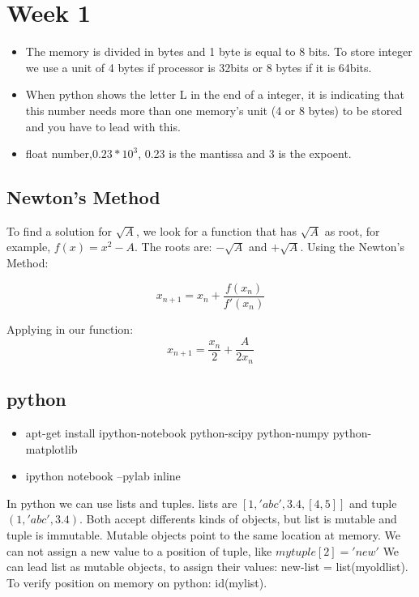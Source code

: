 \section{Week 1}
\begin{itemize}
\item The memory is divided in bytes and 1 byte is equal to 8 bits. To store integer we use a unit of 4 bytes if processor is 32bits or 8 bytes if it is 64bits. 
\item When python shows the letter L in the end of a integer, it is indicating that this number needs more than one memory's unit (4 or 8 bytes) to be stored and you have to lead with this.
\item float number,$0.23 * 10^3$, 0.23 is the mantissa and 3 is the expoent. 
\end{itemize}

\subsection{Newton's Method}
To find a solution for $\sqrt{A}$, we look for a function that has $\sqrt{A}$ as root, for example, $f(x)=x^2-A$. The roots are: $-\sqrt{A}$ and $+\sqrt{A}$. Using the Newton's Method:

\begin{equation}
  x_{n+1} = x_n + \frac{f(x_n)}{f\prime(x_n)} 
\end{equation}

Applying in our function: 
\begin{equation}
  x_{n+1} = \frac{x_n}{2} + \frac{A}{2x_n}
\end{equation}

\subsection{python}
\begin{itemize}
  \item apt-get install ipython-notebook python-scipy python-numpy python-matplotlib
  \item ipython notebook --pylab inline
\end{itemize}

In python we can use lists and tuples. lists are $[1,'abc',3.4,[4,5]]$ and tuple $(1,'abc',3.4)$. 
Both accept differents kinds of objects, but list is mutable and tuple is immutable. Mutable objects point to the same location at memory. We can not assign a new value to a position of tuple, like $mytuple[2] = 'new'$
We can lead list as mutable objects, to assign their values: 
new-list = list(myoldlist). To verify position on memory on python: id(mylist).
